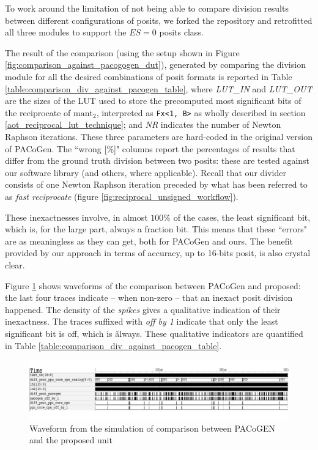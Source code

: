 To work around the limitation of not being able to compare division results between different configurations of posits, we forked the repository and retrofitted all three modules to support the $ES = 0$ posits class.


The result of the comparison (using the setup shown in Figure \ref{fig:comparison_against_pacogogen_dut}), generated by comparing the division module
for all the desired combinations of posit formats is reported in Table \ref{table:comparison_div_against_pacogen_table}, where \textit{LUT\_IN} and \textit{LUT\_OUT} are the sizes of the LUT used to store the precomputed most significant bits of the reciprocate of $\text{mant}_2$, interpreted as \texttt{Fx<1, B>} as wholly described in section \ref{aot_reciprocal_lut_technique}; and \textit{NR} indicates the number of Newton Raphson iterations. These three parameters are hard-coded in the original version of PACoGen.
The ``wrong [\%]" columns report the percentages of results that differ from the ground truth division between two posits: these are tested against our software library (and others, where applicable).
Recall that our divider consists of one Newton Raphson iteration preceded by what has been referred to as \textit{fast reciprocate} (figure \ref{fig:reciprocal_unsigned_workflow}).


These inexactnesses involve, in almost $100 \%$ of the cases, the least significant bit, which is, for the large part, always a fraction bit. This means that these ``errors" are as meaningless as they can get, both for PACoGen and ours.
The benefit provided by our approach in terms of accuracy, up to 16-bits posit, is also crystal clear.


Figure \ref{fig:comparison_against_pacogogen_dut_waveforms} shows waveforms of the comparison between PACoGen and proposed: the last four traces indicate -- when non-zero -- that an inexact posit division happened. The density of the \textit{spikes} gives a qualitative indication of their inexactness. The traces suffixed with \textit{off by 1} indicate that only the least significant bit is off, which is \~ always. These qualitative indicators are quantified in Table \ref{table:comparison_div_against_pacogen_table}.


\begin{figure}
        \includegraphics[width=\textwidth]{figures/waveform_div_against_pacogen.pdf}
        \caption{Waveform from the simulation of comparison between PACoGEN and the proposed unit}
        \label{fig:comparison_against_pacogogen_dut_waveforms}
\end{figure}




